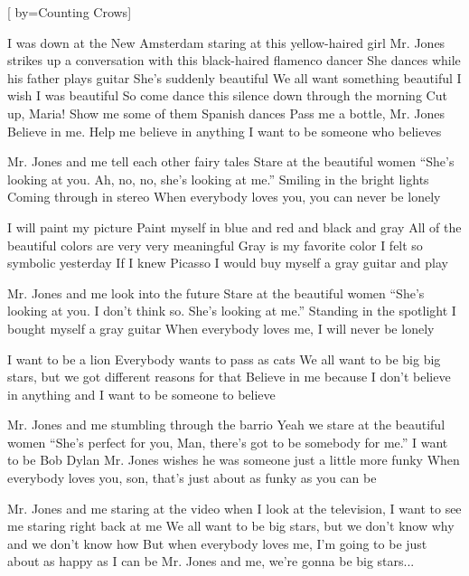 [
	by={Counting Crows}]

\chordson

\beginverse
I was down at the New Amsterdam 
staring at this yellow-haired girl
Mr. Jones strikes up a conversation 
with this black-haired flamenco dancer
She dances while his father plays guitar
She's suddenly beautiful
We all want something beautiful
I wish I was beautiful
So come dance this silence down through the morning
Cut up, Maria! Show me some of them Spanish dances
Pass me a bottle, Mr. Jones
Believe in me. Help me believe in anything
I want to be someone who believes
\endverse

\beginchorus
Mr. Jones and me tell each other fairy tales
Stare at the beautiful women
``She's looking at you. Ah, no, no, she's looking at me.''
Smiling in the bright lights
Coming through in stereo
When everybody loves you, you can never be lonely
\endchorus

\chordsoff
\beginverse
I will paint my picture
Paint myself in blue and red and black and gray
All of the beautiful colors are very very meaningful
Gray is my favorite color
I felt so symbolic yesterday
If I knew Picasso
I would buy myself a gray guitar and play
\endverse

\beginchorus
Mr. Jones and me look into the future
Stare at the beautiful women
``She's looking at you.
I don't think so. She's looking at me.''
Standing in the spotlight
I bought myself a gray guitar
When everybody loves me, I will never be lonely
\endchorus

\beginverse
I want to be a lion
Everybody wants to pass as cats
We all want to be big big stars, but we got different
reasons for that
Believe in me because I don't believe in anything
and I want to be someone to believe
\endverse

\beginchorus
Mr. Jones and me stumbling through the barrio
Yeah we stare at the beautiful women
``She's perfect for you, Man, there's got to be somebody for me.''
I want to be Bob Dylan
Mr. Jones wishes he was someone just a little more funky
When everybody loves you, son, that's just about as
funky as you can be
\endchorus

\beginchorus
Mr. Jones and me staring at the video
when I look at the television, I want to see me staring
right back at me
We all want to be big stars, but we don't know why
and we don't know how
But when everybody loves me, I'm going to be just
about as happy as I can be
Mr. Jones and me, we're gonna be big stars...
\endchorus
\vspace{3cm}

\endsong
